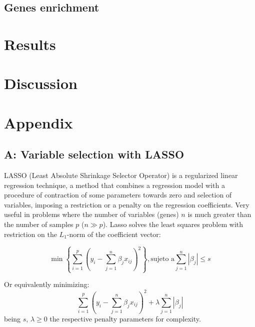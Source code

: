 \documentclass[journal, onecolumn]{IEEEtran}
\newcommand{\abs}[1]{\left\vert#1\right\vert}
\begin{document}

\subsection{Genes enrichment}

\section{Results}

\section{Discussion}





\newpage
\section*{Appendix}
\subsection{A: Variable selection with LASSO}
LASSO (Least Absolute Shrinkage Selector Operator) is a regularized linear regression technique, a method that combines a regression model with a procedure of contraction of some parameters towards zero and selection of variables, imposing a restriction or a penalty on the regression coefficients. Very useful in problems where the number of variables (genes) $ n $ is much greater than the number of samples $ p $ ($ n \gg p $). Lasso solves the least squares problem with restriction on the $ L_1$-norm of the coefficient vector:

\begin{equation}
\min \left\lbrace\sum_{i=1}^{p}{\left( y_i-\sum_{j=1}^n{\beta_j x_{ij}}\right)^2} \right\rbrace , \textrm{sujeto a} \sum_{j=1}^n\abs{\beta_j}\leq s
\end{equation}

Or equivalently minimizing:
\begin{equation}
\sum_{i=1}^{p}{\left( y_i-\sum_{j=1}^n{\beta_j x_{ij}}\right)^2} + \lambda \sum_{j=1}^n\abs{\beta_j}
\end{equation}
being $ s $, $ \lambda \geq 0 $ the respective penalty parameters for complexity.\\
\end{document}
